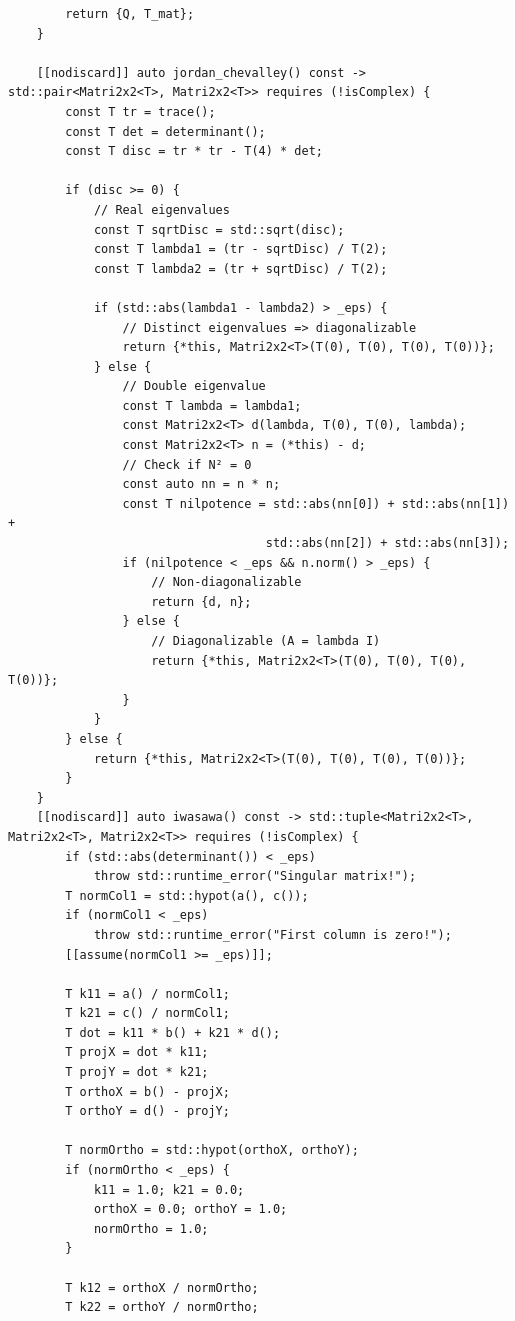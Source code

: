 \documentclass[11pt]{article}
\begin{document}
\begin{lstlisting}
        return {Q, T_mat};
    }

    [[nodiscard]] auto jordan_chevalley() const -> std::pair<Matri2x2<T>, Matri2x2<T>> requires (!isComplex) {
        const T tr = trace();
        const T det = determinant();
        const T disc = tr * tr - T(4) * det;

        if (disc >= 0) {
            // Real eigenvalues
            const T sqrtDisc = std::sqrt(disc);
            const T lambda1 = (tr - sqrtDisc) / T(2);
            const T lambda2 = (tr + sqrtDisc) / T(2);

            if (std::abs(lambda1 - lambda2) > _eps) {
                // Distinct eigenvalues => diagonalizable
                return {*this, Matri2x2<T>(T(0), T(0), T(0), T(0))};
            } else {
                // Double eigenvalue
                const T lambda = lambda1;
                const Matri2x2<T> d(lambda, T(0), T(0), lambda);
                const Matri2x2<T> n = (*this) - d;
                // Check if N² = 0
                const auto nn = n * n;
                const T nilpotence = std::abs(nn[0]) + std::abs(nn[1]) +
                                    std::abs(nn[2]) + std::abs(nn[3]);
                if (nilpotence < _eps && n.norm() > _eps) {
                    // Non-diagonalizable
                    return {d, n};
                } else {
                    // Diagonalizable (A = lambda I)
                    return {*this, Matri2x2<T>(T(0), T(0), T(0), T(0))};
                }
            }
        } else {
            return {*this, Matri2x2<T>(T(0), T(0), T(0), T(0))};
        }
    }
    [[nodiscard]] auto iwasawa() const -> std::tuple<Matri2x2<T>, Matri2x2<T>, Matri2x2<T>> requires (!isComplex) {
        if (std::abs(determinant()) < _eps)
            throw std::runtime_error("Singular matrix!");
        T normCol1 = std::hypot(a(), c());
        if (normCol1 < _eps)
            throw std::runtime_error("First column is zero!");
        [[assume(normCol1 >= _eps)]];

        T k11 = a() / normCol1;
        T k21 = c() / normCol1;        
        T dot = k11 * b() + k21 * d();
        T projX = dot * k11;
        T projY = dot * k21;
        T orthoX = b() - projX;
        T orthoY = d() - projY;
        
        T normOrtho = std::hypot(orthoX, orthoY);
        if (normOrtho < _eps) {
            k11 = 1.0; k21 = 0.0;
            orthoX = 0.0; orthoY = 1.0;
            normOrtho = 1.0;
        }
        
        T k12 = orthoX / normOrtho;
        T k22 = orthoY / normOrtho;
        

\end{lstlisting}
\end{document}
